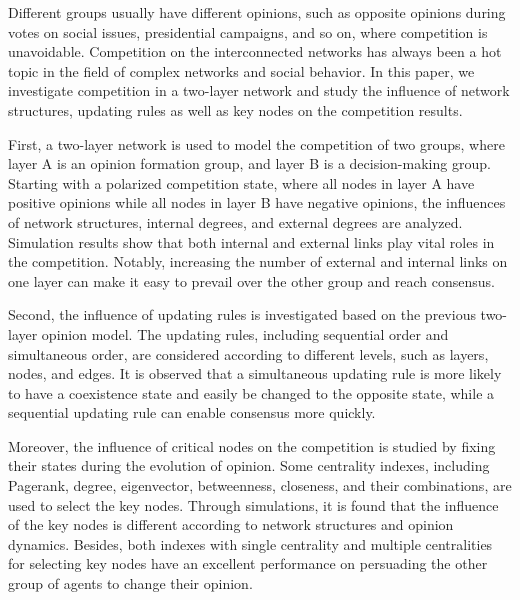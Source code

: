 
\begin{bigabstract}
	
Different groups usually have different opinions, such as opposite opinions during votes on social issues, presidential campaigns, and so on, where competition is unavoidable. Competition on the interconnected networks has always been a hot topic in the field of complex networks and social behavior.  In this paper, we investigate competition in a two-layer network and study the influence of network structures, updating rules as well as key nodes on the competition results.

First, a two-layer network is used to model the competition of two groups, where layer A is an opinion formation group, and layer B is a decision-making group. Starting with a polarized competition state, where all nodes in layer A have positive opinions while all nodes in layer B have negative opinions, the influences of network structures, internal degrees, and external degrees are analyzed.  Simulation results show that both internal and external links play vital roles in the competition. Notably, increasing the number of external and internal links on one layer can make it easy to prevail over the other group and reach consensus.

Second, the influence of updating rules is investigated based on the previous two-layer opinion model. The updating rules, including sequential order and simultaneous order, are considered according to different levels, such as layers, nodes, and edges. It is observed that a simultaneous updating rule is more likely to have a coexistence state and easily be changed to the opposite state, while a sequential updating rule can enable consensus more quickly.

Moreover, the influence of critical nodes on the competition is studied by fixing their states during the evolution of opinion. Some centrality indexes, including Pagerank, degree, eigenvector, betweenness, closeness, and their combinations, are used to select the key nodes. Through simulations, it is found that the influence of the key nodes is different according to network structures and opinion dynamics. Besides, both indexes with single centrality and multiple centralities for selecting key nodes have an excellent performance on persuading the other group of agents to change their opinion.\\ \\ 

\end{bigabstract}